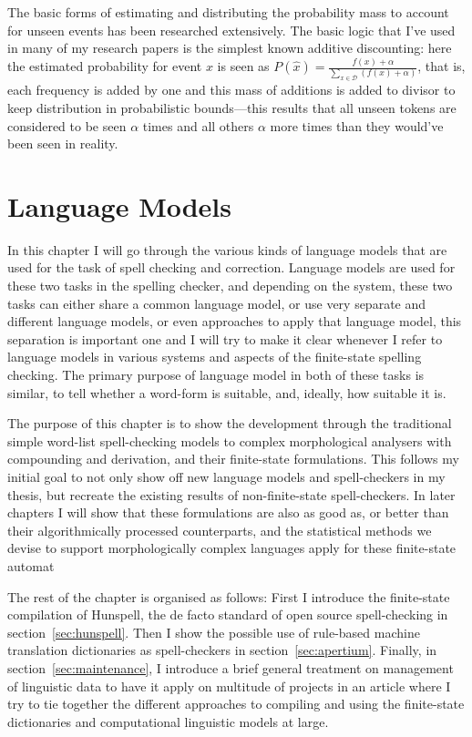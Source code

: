 \documentclass[officiallayout]{unihelcompling}
\begin{document}
The basic forms of estimating and distributing the probability mass to account
for unseen events has been researched extensively. The basic logic that I've
used in many of my research papers is the simplest known additive discounting:
here the estimated probability for event $x$ is seen as 
$P(\hat{x}) = \frac{f(x) + \alpha}{\sum_{x \in \mathcal{D}}(f(x) + \alpha)}$,
that is, each frequency is added by one and this mass of additions is added to
divisor to keep distribution in probabilistic bounds---this results that all
unseen tokens are considered to be seen $\alpha$ times and all others $\alpha$
more times than they would've been seen in reality. 



\chapter{Language Models}
\label{chap:language-models}

In this chapter I will go through the various kinds of language models that are
used for the task of spell checking and correction. Language models are used
for these two tasks in the spelling checker, and depending on the system,
these two tasks can either share a common language model, or use very
separate and different language models, or even approaches to apply that
language model, this separation is important one and I will try to make it
clear whenever I refer to language models in various systems and aspects of
the finite-state spelling checking. The primary purpose of language model in
both of these tasks is similar, to tell whether a word-form is suitable, and,
ideally, how suitable it is.

The purpose of this chapter is to show the development through the traditional
simple word-list spell-checking models to complex morphological analysers with
compounding and derivation, and their finite-state formulations. This follows
my initial goal to not only show off new language models and spell-checkers
in my thesis, but recreate the existing results of non-finite-state 
spell-checkers. In later chapters I will show that these formulations are
also as good as, or better than their algorithmically processed counterparts,
and the statistical methods we devise to support morphologically complex
languages apply for these finite-state automat 

The rest of the chapter is organised as follows: First I introduce the
finite-state compilation of Hunspell, the de facto standard of open source
spell-checking in section~\ref{sec:hunspell}.  Then I show the possible use of
rule-based machine translation dictionaries as spell-checkers in
section~\ref{sec:apertium}.  Finally, in section~\ref{sec:maintenance}, I
introduce a brief general treatment on management of linguistic data to have it
apply on multitude of projects in an article where I try to tie together the
different approaches to compiling and using the finite-state dictionaries and
computational linguistic models at large.
\end{document}
